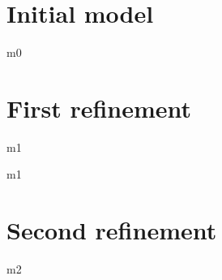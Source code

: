 \documentclass[12pt]{amsart}
\title{}
\author{}
\date{} %
\begin{document}
\maketitle
\tableofcontents

\newcommand{\Train}{\text{TRAIN}}
\newcommand{\Blk}{\text{BLK}}

\section{Initial model}
\begin{machine}{m0}







\end{machine}

\section{First refinement}
\begin{machine}{m1}





\end{machine}{m1}

\section{Second refinement}

\begin{machine}{m2}




\end{machine}
\end{document}
